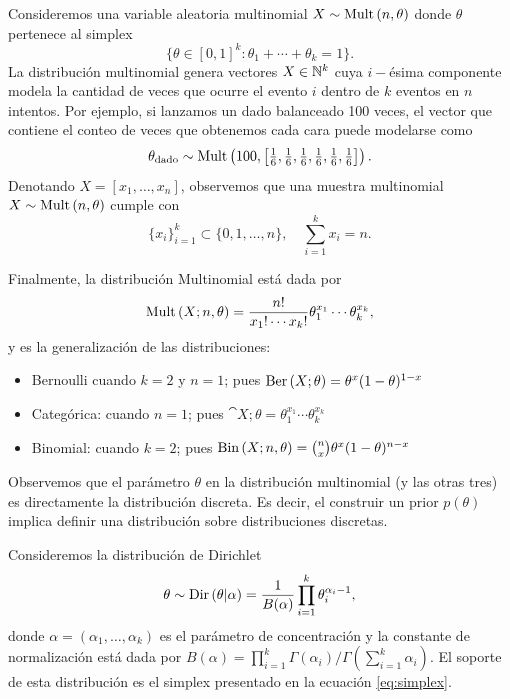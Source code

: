 \begin{example}
Consideremos una variable aleatoria multinomial $X\sim\text{Mult}\left(n,\theta\right)$ donde $\theta$ pertenece al simplex 
\begin{equation}
	\label{eq:simplex}
  \{\theta\in[0,1]^k:\theta_1 + \cdots + \theta_k = 1 \}.
 \end{equation} 
 La distribución multinomial genera vectores $X\in{\mathbb N}^k$ cuya $i-$ésima componente modela la cantidad de veces que ocurre el evento $i$ dentro de $k$ eventos en $n$ intentos. Por ejemplo, si lanzamos un dado balanceado 100 veces, el vector que contiene el conteo de veces que obtenemos cada cara puede modelarse como 
 \begin{equation}
  	\theta_\text{dado} \sim \text{Mult}\left(100,\left[\tfrac{1}{6},\tfrac{1}{6},\tfrac{1}{6},\tfrac{1}{6},\tfrac{1}{6},\tfrac{1}{6}\right]\right).
  \end{equation} 
Denotando $X=[x_1,\ldots,x_n]$, observemos que una muestra multinomial $X\sim\text{Mult}\left(n,\theta\right)$ cumple con 
\begin{equation}
	\{x_i\}_{i=1}^k \subset \{0,1,\ldots,n\},\quad  \sum_{i=1}^kx_i = n.
\end{equation}

Finalmente, la distribución Multinomial está dada por 
\begin{equation}
 	\text{Mult}\left(X;n,\theta\right) = \frac{n!}{x_1!\cdots x_k!} \theta_1^{x_1}\cdots\theta_k^{x_k},
 \end{equation} 
 y es la generalización de las distribuciones: 
\begin{itemize}
	\item Bernoulli cuando $k=2$ y $n=1$; pues $\text{Ber}\left(X;\theta\right) = \theta^{x} (1-\theta)^{1-x}$
	\item Categórica: cuando $n=1$; pues $\cat{X;\theta} = \theta_1^{x_1}\cdots\theta_k^{x_k}$
	\item Binomial: cuando $k=2$; pues $\text{Bin}\left(X;n,\theta\right) = \binom{n}{x} \theta^{x}(1-\theta)^{n-x}$
\end{itemize}
\end{example}

Observemos que el parámetro $\theta$ en la distribución multinomial (y las otras tres) es directamente la distribución discreta. Es decir, el construir un prior $p(\theta)$ implica definir una distribución sobre distribuciones discretas.  


\begin{definition}
Consideremos la  distribución de Dirichlet
\begin{equation}
	\theta \sim \text{Dir}\left(\theta|\alpha\right) = \frac{1}{B(\alpha)} \prod_{i=1}^k \theta_i^{\alpha_i-1},
\end{equation}
donde $\alpha = (\alpha_1,\ldots,\alpha_k)$ es el parámetro de concentración y la constante de normalización está dada por $B(\alpha)=\prod_{i=1}^k\Gamma(\alpha_i)/\Gamma(\sum_{i=1}^k\alpha_i)$. El soporte de esta distribución es el simplex presentado en la ecuación \eqref{eq:simplex}.
\end{definition}


